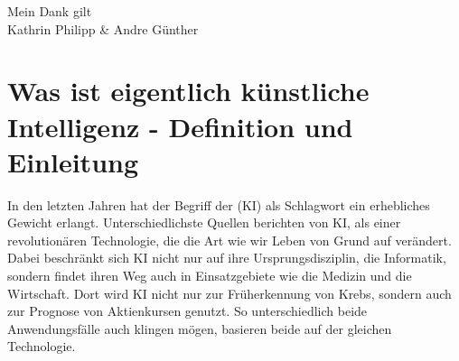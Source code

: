 \documentclass[12pt,german,ngerman]{report}
\begin{document}
    \newpage
        \vspace*{\fill}
            \begin{center}
                Mein Dank gilt \\
                Kathrin Philipp \& Andre Günther
            \end{center}    
        \vspace*{\fill}
    \newpage

        \tableofcontents
        \newpage


    \chapter{Was ist eigentlich künstliche Intelligenz - Definition und Einleitung}


        In den letzten Jahren hat der Begriff der  (KI) als Schlagwort ein erhebliches Gewicht
        erlangt. Unterschiedlichste Quellen berichten von KI, als einer revolutionären Technologie, die die
        Art wie wir Leben von Grund auf verändert.
        Dabei beschränkt sich KI nicht nur auf ihre Ursprungsdisziplin, die Informatik, sondern findet ihren Weg auch in
        Einsatzgebiete wie die Medizin und die Wirtschaft. Dort wird KI nicht nur zur Früherkennung
        von Krebs, sondern auch zur Prognose von Aktienkursen genutzt. So unterschiedlich
        beide Anwendungsfälle auch klingen mögen, basieren beide auf der gleichen Technologie.\\
\end{document}
